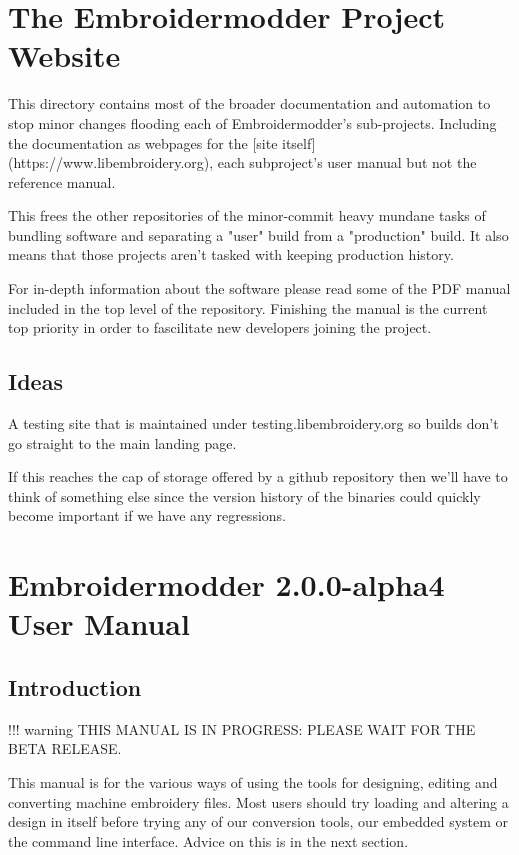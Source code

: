 \section{The Embroidermodder Project Website}

This directory contains most of the broader documentation and automation to
stop minor changes flooding each of Embroidermodder's sub-projects. Including
the documentation as webpages for the
[site itself](https://www.libembroidery.org), each subproject's user manual but
not the reference manual.

This frees the other repositories of the minor-commit heavy mundane tasks of
bundling software and separating a "user" build from a "production" build. It
also means that those projects aren't tasked with keeping production history.

For in-depth information about the software please read some of the PDF manual
included in the top level of the repository. Finishing the manual is the current
top priority in order to fascilitate new developers joining the project.

\subsection{Ideas}

A testing site that is maintained under testing.libembroidery.org so builds
don't go straight to the main landing page.

If this reaches the cap of storage offered by a github repository then we'll
have to think of something else since the version history of the binaries could
quickly become important if we have any regressions.

\section{Embroidermodder 2.0.0-alpha4  User Manual}

\subsection{Introduction}

!!! warning
    THIS MANUAL IS IN PROGRESS: PLEASE WAIT FOR THE BETA RELEASE.

This manual is for the various ways of using the \embname tools for designing,
editing and converting machine embroidery files. Most users should try loading and altering a design
in \embname itself before trying any of our conversion tools, our embedded system
or the command line interface. Advice on this is in the next section.

